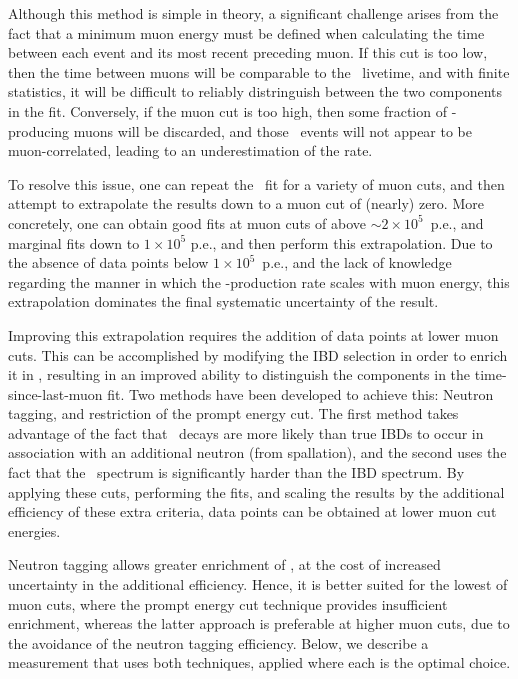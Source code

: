 \documentclass[../thesis.tex]{subfiles}
\begin{document}
Although this method is simple in theory, a significant challenge arises from the fact that a minimum muon energy must be defined when calculating the time between each event and its most recent preceding muon. If this cut is too low, then the time between muons will be comparable to the \linine\ livetime, and with finite statistics, it will be difficult to reliably distringuish between the two components in the fit. Conversely, if the muon cut is too high, then some fraction of \linine-producing muons will be discarded, and those \linine\ events will not appear to be muon-correlated, leading to an underestimation of the rate.

To resolve this issue, one can repeat the \linine\ fit for a variety of muon cuts, and then attempt to extrapolate the results down to a muon cut of (nearly) zero. More concretely, one can obtain good fits at muon cuts of above $\sim 2\times10^5$~p.e., and marginal fits down to $1\times10^5$ p.e., and then perform this extrapolation. Due to the absence of data points below $1\times10^5$~p.e., and the lack of knowledge regarding the manner in which the \linine-production rate scales with muon energy, this extrapolation dominates the final systematic uncertainty of the result.

Improving this extrapolation requires the addition of data points at lower muon cuts. This can be accomplished by modifying the IBD selection in order to enrich it in \linine, resulting in an improved ability to distinguish the components in the time-since-last-muon fit. Two methods have been developed to achieve this: Neutron tagging, and restriction of the prompt energy cut. The first method takes advantage of the fact that \linine\ decays are more likely than true IBDs to occur in association with an additional neutron (from spallation), and the second uses the fact that the \linine\ spectrum is significantly harder than the IBD spectrum. By applying these cuts, performing the fits, and scaling the results by the additional efficiency of these extra criteria, data points can be obtained at lower muon cut energies.

Neutron tagging allows greater enrichment of \linine, at the cost of increased uncertainty in the additional efficiency. Hence, it is better suited for the lowest of muon cuts, where the prompt energy cut technique provides insufficient enrichment, whereas the latter approach is preferable at higher muon cuts, due to the avoidance of the neutron tagging efficiency. Below, we describe a measurement that uses both techniques, applied where each is the optimal choice.
\end{document}
